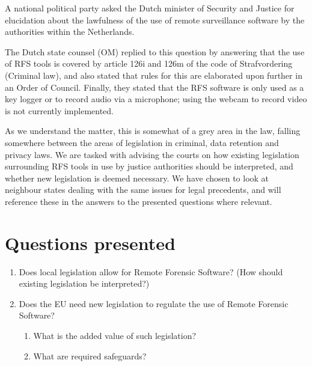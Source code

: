 \documentclass[11pt]{article} %
\begin{document}
A national political party asked the Dutch minister of Security and Justice for elucidation about the lawfulness of the use of remote surveillance software by the authorities within the Netherlands. \cite{d66kamervragen}

The Dutch state counsel (OM) replied to this question by answering that the use of RFS tools is covered by article 126i and 126m of the code of Strafvordering (Criminal law), and also stated that rules for this are elaborated upon further in an Order of Council.
Finally, they stated that the RFS software is only used as a key logger or to record audio via a microphone; using the webcam to record video is not currently implemented. \cite{webwereld}

As we understand the matter, this is somewhat of a grey area in the law, falling somewhere between the areas of legislation in criminal, data retention and privacy laws.
We are tasked with advising the courts on how existing legislation surrounding RFS tools in use by justice authorities should be interpreted, and whether new legislation is deemed necessary.
We have chosen to look at neighbour states dealing with the same issues for legal precedents, and will reference these in the answers to the presented questions where relevant.




\section{Questions presented}
\begin{enumerate}
	\item{Does local legislation allow for Remote Forensic Software? (How should existing legislation be interpreted?)}
	\item{Does the EU need new legislation to regulate the use of Remote Forensic Software?}

	\begin{enumerate}
	\item{What is the added value of such legislation?}
	\item{What are required safeguards?}
	\end{enumerate}
\end{enumerate}
\end{document}
